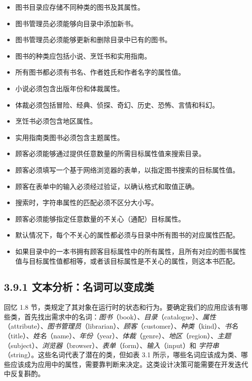 \begin{itemize}
\item 图书目录应存储不同种类的图书及其属性。
\item 图书管理员必须能够向目录中添加新书。
\item 图书管理员必须能够更新和删除目录中已有的图书。
\item 图书的种类应包括小说、烹饪书和实用指南。
\item 所有图书都必须有书名、作者姓氏和作者名字的属性值。
\item 小说必须包含出版年份和体裁属性。
\item 体裁必须包括冒险、经典、侦探、奇幻、历史、恐怖、言情和科幻。
\item 烹饪书必须包含地区属性。
\item 实用指南类图书必须包含主题属性。
\item 顾客必须能够通过提供任意数量的所需目标属性值来搜索目录。
\item 顾客必须填写一个基于网络浏览器的表单，以指定图书搜索的目标属性值。
\item 顾客在表单中的输入必须经过验证，以确认格式和取值正确。
\item 搜索时，字符串属性的匹配必须不区分大小写。
\item 顾客必须能够指定任意数量的不关心（通配）目标属性。
\item 默认情况下，每个不关心的属性都必须与目录中所有图书的对应属性匹配。
\item 如果目录中的一本书拥有顾客目标属性中的所有属性，且所有对应的图书属性值与目标属性值都相等，或者该目标属性是不关心的属性，则这本书匹配。
\end{itemize}

\subsection{3.9.1 文本分析：名词可以变成类}

回忆 1.8 节，类规定了其对象在运行时的状态和行为。要确定我们的应用应该有哪些类，首先找出需求中的名词：\emph{图书}（book）、\emph{目录}（catalogue）、\emph{属性}（attribute）、\emph{图书管理员}（librarian）、\emph{顾客}（customer）、\emph{种类}（kind）、\emph{书名}（title）、\emph{姓名}（name）、\emph{年份}（year）、\emph{体裁}（genre）、\emph{地区}（region）、\emph{主题}（subject）、\emph{浏览器}（browser）、\emph{表单}（form）、\emph{输入}（input）和 \emph{字符串}（string）。这些名词代表了潜在的类，但如表 3.1 所示，哪些名词应该成为类、哪些应该成为应用中的属性，需要靠判断来决定。这类设计决策可能需要在开发迭代中反复斟酌。

